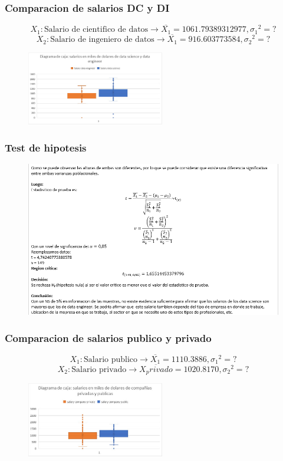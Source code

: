 \documentclass{beamer}
\begin{document}
\begin{frame}
  \frametitle{Comparacion de salarios DC y DI}
  \[{X_1}: \textrm{Salario de cientifico de datos} \rightarrow \overline{X_1} = 1061.79389312977, {\sigma_1}^2 = ?\]
  \[{X_2}: \textrm{Salario de ingeniero de datos} \rightarrow \overline{X_1} = 916.603773584, {\sigma_2}^2 = ?\]
\begin{figure}[t]
  \includegraphics[width=6cm]{cajas1.jpeg}
\end{figure}
\end{frame}

\begin{frame}
  \frametitle{Test de hipotesis}
\begin{figure}[t]
    \includegraphics[width=12cm]{Screenshot_20221028_234650.png}
\end{figure}
\end{frame}

\begin{frame}
  \frametitle{Comparacion de salarios publico y privado}
  \[{X_1}: \textrm{Salario publico} \rightarrow \overline{X_1} = 1110.3886, {\sigma_1}^2 = ?\]
  \[{X_2}: \textrm{Salario privado} \rightarrow \overline{X_privado} = 1020.8170, {\sigma_2}^2 = ?\]
\begin{figure}[t]
  \includegraphics[width=6cm]{cajas2.jpeg}
\end{figure}
\end{frame}
\end{document}
